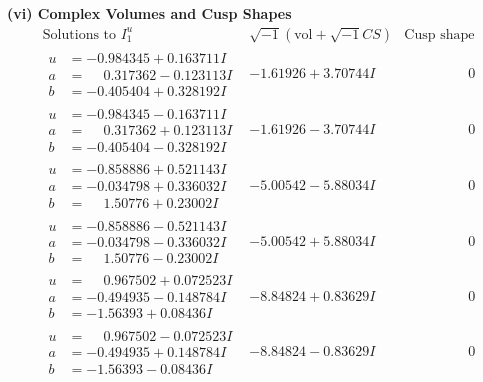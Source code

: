 \documentclass[1p]{elsarticle_modified}
\theoremstyle{definition}
\newcommand{\I}{\sqrt{-1}}
\begin{document}
\newpage\flushleft \textbf{(vi) Complex Volumes and Cusp Shapes}
$$\begin{array}{c|c|c}  
\text{Solutions to }I^u_{1}& \I (\text{vol} + \sqrt{-1}CS) & \text{Cusp shape}\\
 \hline 
\begin{aligned}
u &= -0.984345 + 0.163711 I \\
a &= \phantom{-}0.317362 - 0.123113 I \\
b &= -0.405404 + 0.328192 I\end{aligned}
 & -1.61926 + 3.70744 I & \phantom{-0.000000 } 0 \\ \hline\begin{aligned}
u &= -0.984345 - 0.163711 I \\
a &= \phantom{-}0.317362 + 0.123113 I \\
b &= -0.405404 - 0.328192 I\end{aligned}
 & -1.61926 - 3.70744 I & \phantom{-0.000000 } 0 \\ \hline\begin{aligned}
u &= -0.858886 + 0.521143 I \\
a &= -0.034798 + 0.336032 I \\
b &= \phantom{-}1.50776 + 0.23002 I\end{aligned}
 & -5.00542 - 5.88034 I & \phantom{-0.000000 } 0 \\ \hline\begin{aligned}
u &= -0.858886 - 0.521143 I \\
a &= -0.034798 - 0.336032 I \\
b &= \phantom{-}1.50776 - 0.23002 I\end{aligned}
 & -5.00542 + 5.88034 I & \phantom{-0.000000 } 0 \\ \hline\begin{aligned}
u &= \phantom{-}0.967502 + 0.072523 I \\
a &= -0.494935 - 0.148784 I \\
b &= -1.56393 + 0.08436 I\end{aligned}
 & -8.84824 + 0.83629 I & \phantom{-0.000000 } 0 \\ \hline\begin{aligned}
u &= \phantom{-}0.967502 - 0.072523 I \\
a &= -0.494935 + 0.148784 I \\
b &= -1.56393 - 0.08436 I\end{aligned}
 & -8.84824 - 0.83629 I & \phantom{-0.000000 } 0 \\ \hline\begin{aligned}

\end{aligned}
\end{array}$$
\end{document}
